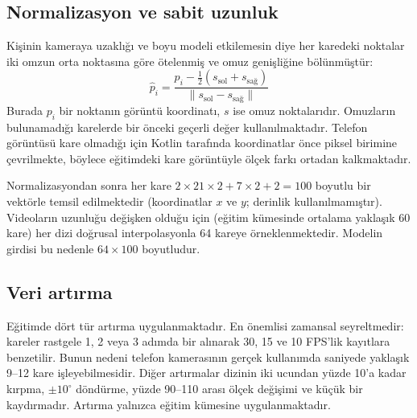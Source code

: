 \subsection{Normalizasyon ve sabit uzunluk}

Kişinin kameraya uzaklığı ve boyu modeli etkilemesin diye her karedeki noktalar iki
omzun orta noktasına göre ötelenmiş ve omuz genişliğine bölünmüştür:
\begin{equation}
  \hat{p}_i = \frac{p_i - \tfrac{1}{2}(s_{\text{sol}} + s_{\text{sağ}})}{\lVert s_{\text{sol}} - s_{\text{sağ}} \rVert}
\end{equation}
Burada $p_i$ bir noktanın görüntü koordinatı, $s$ ise omuz noktalarıdır. Omuzların
bulunamadığı karelerde bir önceki geçerli değer kullanılmaktadır. Telefon görüntüsü
kare olmadığı için Kotlin tarafında koordinatlar önce piksel birimine çevrilmekte,
böylece eğitimdeki kare görüntüyle ölçek farkı ortadan kalkmaktadır.

Normalizasyondan sonra her kare
$2\times21\times2 + 7\times2 + 2 = 100$ boyutlu bir vektörle temsil edilmektedir
(koordinatlar $x$ ve $y$; derinlik kullanılmamıştır). Videoların uzunluğu değişken
olduğu için (eğitim kümesinde ortalama yaklaşık 60 kare) her dizi doğrusal
interpolasyonla 64 kareye örneklenmektedir. Modelin girdisi bu nedenle
$64\times100$ boyutludur.

\subsection{Veri artırma}

Eğitimde dört tür artırma uygulanmaktadır. En önemlisi zamansal seyreltmedir: kareler
rastgele 1, 2 veya 3 adımda bir alınarak 30, 15 ve 10 FPS'lik kayıtlara benzetilir.
Bunun nedeni telefon kamerasının gerçek kullanımda saniyede yaklaşık 9--12 kare
işleyebilmesidir. Diğer artırmalar dizinin iki ucundan yüzde 10'a kadar kırpma,
$\pm10^\circ$ döndürme, yüzde 90--110 arası ölçek değişimi ve küçük bir kaydırmadır.
Artırma yalnızca eğitim kümesine uygulanmaktadır.
